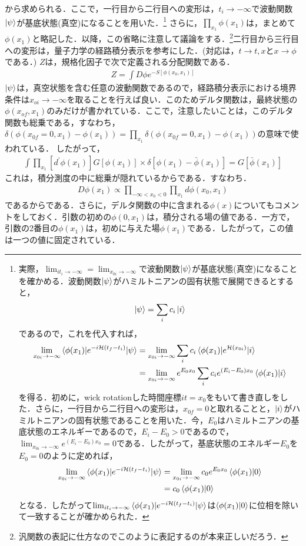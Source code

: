 から求められる．ここで，一行目から二行目への変形は，$t_i\to -\infty$で波動関数$\ket{\psi}$が基底状態(真空)になることを用いた．\footnote{実際，$\lim_{it_i\to -\infty}=\lim_{x_{0i}\to -\infty}$で波動関数$\ket{\psi}$が基底状態(真空)になることを確かめる．波動関数$\ket{\psi}$がハミルトニアンの固有状態で展開できるとすると，
\begin{align}
  \ket{\psi}=\sum_{i}c_{i}\ket{i}
\end{align}
であるので，これを代入すれば，
\begin{align}
  \lim_{x_{0i}\to -\infty}\braket{\phi(x_1)|e^{-i\mathcal
  {H}(t_f-t_i)}|\psi}&=\lim_{x_{0i}\to -\infty}\sum_{i}c_{i}\braket{\phi(x_1)|e^{\mathcal
  {H}(x_{0i})}|i}\\
  &=\lim_{x_{0i}\to -\infty}e^{E_0x_0}\sum_{i}c_{i}e^{(E_i-E_0)x_0}\braket{\phi(x_1)|i}
\end{align}
を得る．初めに，wick rotationした時間座標$it=x_0$をもいて書き直しをした．さらに，一行目から二行目への変形は，$x_{0f}=0$と取れることと，$\ket{i}$がハミルトニアンの固有状態であることを用いた．今，$E_0$はハミルトニアンの基底状態のエネルギーであるので，$E_{i}-E_0>0$であるので，$\lim_{x_{0i} \to -\infty}e^{(E_i-E_0)x_0}=0$である．したがって，基底状態のエネルギー$E_0$を$E_0=0$のように定めれば，
\begin{align}
  \lim_{x_{0i}\to -\infty}\braket{\phi(x_1)|e^{-i\mathcal
  {H}(t_f-t_i)}|\psi}&=\lim_{x_{0i}\to -\infty}c_0e^{E_0x_0}\braket{\phi(x_1)|0}\\
  &=c_0\braket{\phi(x_1)|0}
\end{align}
となる．したがって$\lim_{it_i\to -\infty}\braket{\phi(x_1)|e^{-i\mathcal
{H}(t_f-t_i)}|\psi}$は$\braket{\phi(x_1)|0}$に位相を除いて一致することが確かめられた．}
さらに，$\prod_{x_1}\phi(x_1)$は，まとめて$\phi(x_1)$と略記した．以降，この省略に注意して議論をする．\footnote{汎関数の表記に仕方なのでこのように表記するのが本来正しいだろう．}二行目から三行目への変形は，量子力学の経路積分表示を参考にした．(対応は，$t\rightarrow t,x$と$x\rightarrow \phi$である．)
$Z$は，規格化因子で次で定義される分配関数である．
\begin{align}
  Z=\int D\phi e^{-S[\phi(x_0,x_1)]}
\end{align}
$\ket{\psi}$は，真空状態を含む任意の波動関数であるので，経路積分表示における境界条件は$x_{oi}\to -\infty$を取ることを行えば良い．このためデルタ関数は，最終状態の$\phi(x_{of},x_1)$のみだけが書かれている．ここで，注意したいことは，このデルタ関数も総乗である，すなわち，
$\delta(\phi(x_{0f}=0,x_1)-\phi(x_1))=\prod_{x_1}\delta(\phi(x_{0f}=0,x_1)-\phi(x_1))$の意味で使われている． したがって，
\begin{align}
  \int\prod_{x_1}[d^{\prime}\phi(x_1)]G[\phi(x_1)]\times\delta[\phi(x_1)-\bar{\phi}(x_1)]=G[\bar\phi(x_1)]
\end{align}
これは，積分測度の中に総乗が隠れているからである．すなわち．
\begin{align}
  D\phi(x_1)\propto \prod_{-\infty<x_0<0}\prod_{x_1}d\phi(x_0,x_1)
\end{align}
であるからである．さらに，デルタ関数の中に含まれる$\phi(x)$についてもコメントをしておく．引数の初めの$\phi(0,x_1)$は，積分される場の値である．一方で，引数の2番目の$\phi(x_1)$は，初めに与えた場$\phi(x_1)$である．したがって，この値は一つの値に固定されている．

